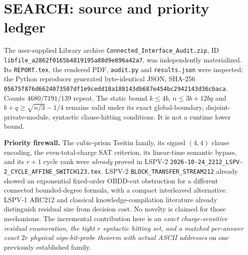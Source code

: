 \documentclass[11pt]{article}
\begin{document}
\section{SEARCH: source and priority ledger}
The user-supplied Library archive \texttt{Connected\_Interface\_Audit.zip}, ID \texttt{libfile\_a2862f0165b4819195a88d9e896a42a7}, was independently materialized. Its \texttt{REPORT.tex}, the rendered PDF, \texttt{audit.py} and \texttt{results.json} were inspected; the Python reproducer generated byte-identical JSON, SHA-256 \texttt{05675f876d6624073507df1e9cedd18a188143db687e454bc2942143d36cbaca}. Counts $4680/7191/139$ repeat. The static bound $k\le4b$, $n\le3b+12bq$ and $b+q\ge\sqrt{n/3}-1/4$ remains valid under its exact global-boundary, disjoint-private-module, syntactic clause-hitting conditions. It is not a runtime lower bound.

\textbf{Priority firewall.} The cubic-prism Tseitin family, its signed $(4,4)$ clause encoding, the even-total-charge SAT criterion, its linear-time semantic bypass, and its $r+1$ cycle rank were \emph{already} proved in LSPV-2 \texttt{2026-10-24\_2212\_LSPV-2\_CYCLE\_AFFINE\_SWITCH123.tex}. LSPV-2 \texttt{BLOCK\_TRANSFER\_STREAM212} already showed an exponential fixed-order OBDD-cut obstruction for a different connected bounded-degree formula, with a compact interleaved alternative. LSPV-1 ARC212 and classical knowledge-compilation literature already distinguish residual size from decision cost. No novelty is claimed for those mechanisms. The incremental contribution here is an \emph{exact charge-sensitive residual enumeration, the tight $r$ syntactic hitting set, and a matched per-answer exact $2r$ physical sign-bit-probe theorem with actual ASCII addresses} on one previously established family.
\end{document}
